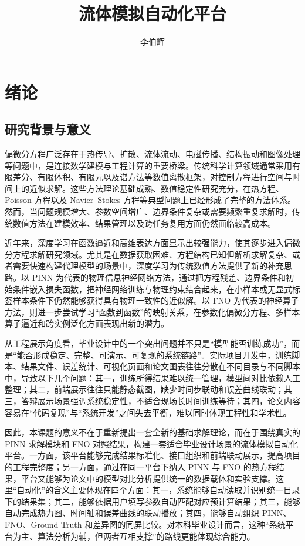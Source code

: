 \documentclass[UTF8,zihao=-4]{oucart}
\title{流体模拟自动化平台}
\author{李伯辉}
\begin{document}
\makecover
\makesignature
\makeabstract

\thispagestyle{tableofcontents}
\tableofcontents
\newpage

\setcounter{page}{1}

\section{绪论}

\subsection{研究背景与意义}

偏微分方程广泛存在于热传导、扩散、流体流动、电磁传播、结构振动和图像处理等问题中，是连接数学建模与工程计算的重要桥梁。传统科学计算领域通常采用有限差分、有限体积、有限元以及谱方法等数值离散框架，对控制方程进行空间与时间上的近似求解\cite{crank1947,evans2010}。这些方法理论基础成熟、数值稳定性研究充分，在热方程、Poisson 方程以及 Navier--Stokes 方程等典型问题上已经形成了完整的方法体系。然而，当问题规模增大、参数空间增广、边界条件复杂或需要频繁重复求解时，传统数值方法在建模效率、结果管理以及跨任务复用方面仍然面临较高成本。

近年来，深度学习在函数逼近和高维表达方面显示出较强能力，使其逐步进入偏微分方程求解研究领域。尤其是在数据获取困难、方程结构已知但解析求解复杂、或者需要快速构建代理模型的场景中，深度学习为传统数值方法提供了新的补充思路。以 PINN 为代表的物理信息神经网络方法，通过把方程残差、边界条件和初始条件嵌入损失函数，把神经网络训练与物理约束结合起来，在小样本或无显式标签样本条件下仍然能够获得具有物理一致性的近似解\cite{raissi2019,karniadakis2021}。以 FNO 为代表的神经算子方法，则进一步尝试学习“函数到函数”的映射关系，在参数化偏微分方程、多样本算子逼近和跨实例泛化方面表现出新的潜力\cite{li2021fno,kovachki2023}。

从工程展示角度看，毕业设计中的一个突出问题并不只是“模型能否训练成功”，而是“能否形成稳定、完整、可演示、可复现的系统链路”。实际项目开发中，训练脚本、结果文件、误差统计、可视化页面和论文图表往往分散在不同目录与不同脚本中，导致以下几个问题：其一，训练所得结果难以统一管理，模型间对比依赖人工整理；其二，前端展示往往只能静态截图，缺少时间步联动和误差曲线联动；其三，答辩展示场景强调系统稳定性，不适合现场长时间训练等待；其四，论文内容容易在“代码复现”与“系统开发”之间失去平衡，难以同时体现工程性和学术性。

因此，本课题的意义不在于重新提出一套全新的基础求解理论，而在于围绕真实的 PINN 求解模块和 FNO 对照结果，构建一套适合毕业设计场景的流体模拟自动化平台。一方面，该平台能够完成结果标准化、接口组织和前端联动展示，提高项目的工程完整度；另一方面，通过在同一平台下纳入 PINN 与 FNO 的热方程结果，平台又能够为论文中的模型对比分析提供统一的数据载体和实验支撑。这里“自动化”的含义主要体现在四个方面：其一，系统能够自动读取并识别统一目录下的结果集；其二，能够依据用户填写参数自动匹配对应预计算结果；其三，能够自动完成热力图、时间轴和误差曲线的联动播放；其四，能够自动组织 PINN、FNO、Ground Truth 和差异图的同屏比较。对本科毕业设计而言，这种“系统平台为主、算法分析为辅，但两者互相支撑”的路线更能体现综合能力。
\end{document}
